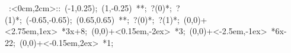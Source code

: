 \hbox{
\xy    <2cm,0cm>:<0cm,2cm>::
       (-1,0.25); (1,-0.25) **\dir{-}; ?(0)*\dir{<}; ?(1)*\dir{>};
       (-0.65,-0.65); (0.65,0.65) **\dir{-}; ?(0)*\dir{<}; ?(1)*\dir{>};
       (0,0)+<2.75em,1ex> *{3x+8};
       (0,0)+<0.15em,-2ex> *{3};
       (0,0)+<-2.5em,-1ex> *{6x-22};
       (0,0)+<-0.15em,2ex> *{1};
\endxy}

